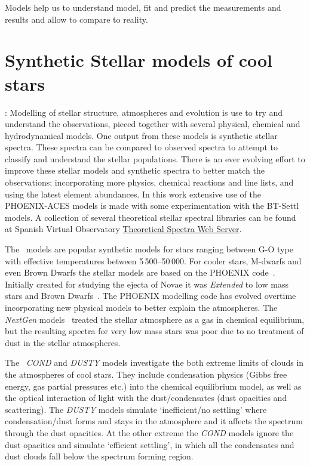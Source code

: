 
Models help us to understand model, fit and predict the measurements and results and allow to compare to reality.

\section{Synthetic Stellar models of cool stars}:
Modelling of stellar structure, atmospheres and evolution is use to try and understand the observations, pieced together with several physical, chemical and hydrodynamical models.
One output from these models is synthetic stellar spectra.
These spectra can be compared to observed spectra to attempt to classify and understand the stellar populations.
There is an ever evolving effort to improve these stellar models and synthetic spectra to better match the observations; incorporating more physics, chemical reactions and line lists, and using the latest element abundances.
In this work extensive use of the {PHOENIX-ACES} models is made with some experimentation with the {BT-Settl} models.
A collection of several theoretical stellar spectral libraries can be found at Spanish Virtual Observatory \href{http://svo2.cab.inta-csic.es/theory/newov/index.php}{Theoretical Spectra Web Server}.

The~\citet{kurucz_model_1979} models are popular synthetic models for stars ranging between G-O type with effective temperatures between 5\,500--50\,000\K{}.
For cooler stars, M-dwarfs and even Brown Dwarfs the stellar models are based on the {PHOENIX} code~\citep[e.g.][]{hauschildt_parallel_1997}.
Initially created for studying the ejecta of Novae it was \emph{Extended} to low mass stars and Brown Dwarfs~\citep{allard_model_1995}.
The {PHOENIX} modelling code has evolved overtime incorporating new physical models to better explain the atmospheres.
The \emph{NextGen} models~\citep{hauschildt_nextgen_1999} treated the stellar atmosphere as a gas in chemical equilibrium, but the resulting spectra for very low mass stars was poor due to no treatment of dust in the stellar atmospheres.

The~\citep{allard_limiting_2001} \emph{COND} and \emph{DUSTY} models investigate the both extreme limits of clouds in the atmospheres of cool stars.
They include condensation physics (Gibbs free energy, gas partial pressures etc.) into the chemical equilibrium model, as well as the optical interaction of light with the dust/condensates (dust opacities and scattering).
The \emph{DUSTY} models simulate `inefficient/no settling' where condensation/dust forms and stays in the atmosphere and it affects the spectrum through the dust opacities.
At the other extreme the \emph{COND} models ignore the dust opacities and simulate `efficient settling', in which all the condensates and dust clouds fall below the spectrum forming region.

